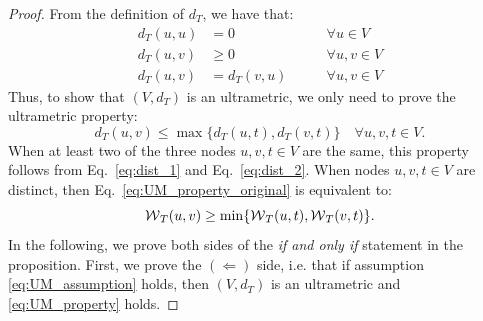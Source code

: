 \firstUltraMetricProperty*
\begin{proof}

From the definition of $d_{T}$, we have that:
\begin{align}
d_{T}(u,u) &= 0 \qquad &\forall u\in V \label{eq:dist_1} \\ 
d_{T}(u,v) &\geq 0 \qquad &\forall u,v \in V \label{eq:dist_2}\\
d_{T}(u,v)& =d_{T}(v,u) \qquad &\forall u,v \in V \label{eq:dist_3}
\end{align}
Thus, to show that $(V, d_{T})$ is an ultrametric, we only need to prove the ultrametric property:
\begin{equation}\label{eq:UM_property_original}
d_T(u,v) \leq \max \{d_T(u,t), d_T(v,t)\} \quad \forall u,v,t \in V.
\end{equation}
When at least two of the three nodes $u,v,t \in V$ are the same, this property follows from Eq.~\ref{eq:dist_1} and Eq.~\ref{eq:dist_2}. When nodes $u,v,t\in V$ are distinct, then Eq.~\ref{eq:UM_property_original} is equivalent to:
\begin{equation}\label{eq:UM_property}
\mathcal{W}{}_{T}(u,v) \geq \min \{\mathcal{W}{}_{T}(u,t), \mathcal{W}{}_{T}(v,t)\}.
\end{equation}
In the following, we prove both sides of the \emph{if and only if} statement in the proposition. First, we prove the $(\Leftarrow)$ side, i.e. that if assumption \ref{eq:UM_assumption} holds, then $(V, d_{T})$ is an ultrametric and \ref{eq:UM_property} holds. 


\end{proof}
